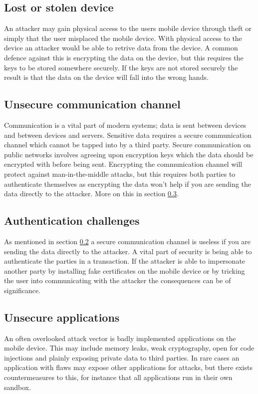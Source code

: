 \subsection{Lost or stolen device}
An attacker may gain physical access to the users mobile device through theft or simply that the user misplaced the mobile device. With physical access to the device an attacker would be able to retrive data from the device. A common defence against this is encrypting the data on the device, but this requires the keys to be stored somewhere securely. If the keys are not stored securely the result is that the data on the device will fall into the wrong hands.

\subsection{Unsecure communication channel}
\label{sec:unsecureCommunication}
Communication is a vital part of modern systems; data is sent between devices and between devices and servers. Sensitive data requires a secure communication channel which cannot be tapped into by a third party. Secure communication on public networks involves agreeing upon encryption keys which the data should be encrypted with before being sent. Encrypting the communication channel will protect against man-in-the-middle attacks, but this requires both parties to authenticate themselves as encrypting the data won't help if you are sending the data directly to the attacker. More on this in section \ref{sec:authenticationChallenges}.

\subsection{Authentication challenges}
\label{sec:authenticationChallenges}
As mentioned in section \ref{sec:unsecureCommunication} a secure communication channel is useless if you are sending the data directly to the attacker. A vital part of security is being able to authenticate the parties in a transaction. If the attacker is able to impersonate another party by installing fake certificates on the mobile device or by tricking the user into communicating with the attacker the consequences can be of significance.

\subsection{Unsecure applications}
An often overlooked attack vector is badly implemented applications on the mobile device. This may include memory leaks, weak cryptography, open for code injections and plainly exposing private data to third parties. In rare cases an application with flaws may expose other applications for attacks, but there exists countermeasures to this, for instance that all applications run in their own sandbox.
